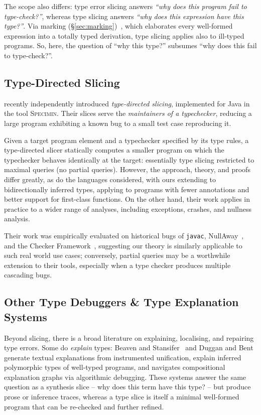 The scope also differs: type error slicing answers \emph{``why does this program fail to type-check?''}, whereas type slicing answers \emph{``why does this expression have this type?''}. Via marking (\S\ref{sec:marking})~\cite{Marking2024}, which elaborates every well-formed expression into a totally typed derivation, type slicing applies also to ill-typed programs. So, here, the question of ``why this type?'' subsumes ``why does this fail to type-check?''.

\subsection{Type-Directed Slicing}
\label{sec:cmp-type-directed}

\citet{TypeDirectedSlicing} recently independently introduced \emph{type-directed slicing}, implemented for Java in the tool \textsc{Specimin}. Their slices serve the \emph{maintainers of a typechecker}, reducing a large program exhibiting a known bug to a small test case reproducing it.

Given a target program element and a typechecker specified by its type rules, a type-directed slicer statically computes a smaller program on which the typechecker behaves identically at the target: essentially type slicing restricted to maximal queries (no partial queries). However, the approach, theory, and proofs differ greatly, as do the languages considered, with ours extending to bidirectionally inferred types, applying to programs with fewer annotations and better support for first-class functions. On the other hand, their work applies in practice to a wider range of analyses, including exceptions, crashes, and nullness analysis.

Their work was empirically evaluated on historical bugs of \texttt{javac}, NullAway~\cite{NullAway}, and the Checker Framework~\cite{CheckerFramework}, suggesting our theory is similarly applicable to such real world use cases; conversely, partial queries may be a worthwhile extension to their tools, especially when a type checker produces multiple cascading bugs.

\subsection{Other Type Debuggers \& Type Explanation Systems}
\label{sec:cmp-debuggers}

Beyond slicing, there is a broad literature on explaining, localising, and repairing type errors. Some do \emph{explain} types: Beaven and Stansifer~\cite{BeavenStansifer1993} and Duggan and Bent~\cite{DugganBent1996} generate textual explanations from instrumented unification, \citet{YangMichaelsonTrinder2002} explain inferred polymorphic types of well-typed programs, and \citet{Chitil2001} navigates compositional explanation graphs via algorithmic debugging. These systems answer the same question as a synthesis slice -- why does this term have this type? -- but produce prose or inference traces, whereas a type slice is itself a minimal well-formed program that can be re-checked and further refined. 

